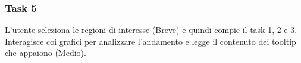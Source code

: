 \subsubsection{Task 5}
\label{sss:iaa-task-5}

L'utente seleziona le regioni di interesse (Breve) e quindi compie il task 1, 2 e 3.
Interagisce coi grafici per analizzare l'andamento e legge il contenuto dei tooltip che appaiono (Medio).